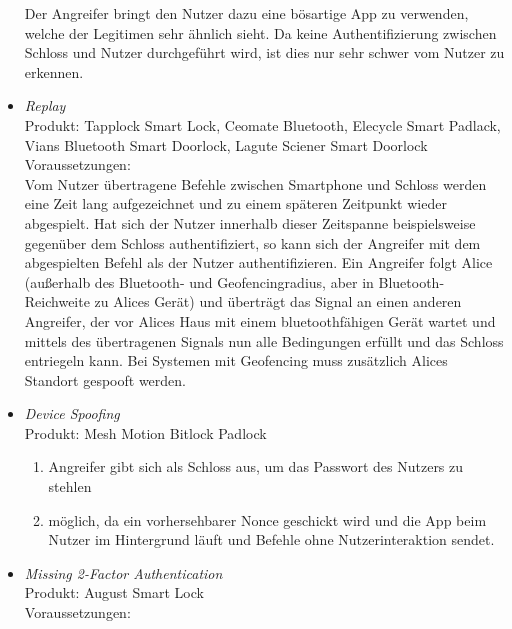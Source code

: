 \begin{itemize}[leftmargin=0cm,label={}]
                Der Angreifer bringt den Nutzer dazu eine bösartige App zu verwenden, welche der Legitimen sehr ähnlich sieht. 
                Da keine Authentifizierung zwischen Schloss und Nutzer durchgeführt wird, ist dies nur sehr schwer vom Nutzer zu erkennen.
            \item \emph{Replay}\cite{Tierney2018,Rose2016,Ho2016}\label{vuln:replay}\\
                Produkt: Tapplock Smart Lock, Ceomate Bluetooth, Elecycle Smart Padlack, Vians Bluetooth Smart Doorlock, Lagute Sciener Smart Doorlock\\
                Voraussetzungen: \\  
                Vom Nutzer übertragene Befehle zwischen Smartphone und Schloss werden eine Zeit lang aufgezeichnet und zu einem späteren Zeitpunkt wieder abgespielt. 
                Hat sich der Nutzer innerhalb dieser Zeitspanne beispielsweise gegenüber dem Schloss authentifiziert, so kann sich der Angreifer mit dem abgespielten Befehl als der Nutzer authentifizieren.
                Ein Angreifer folgt Alice (außerhalb des Bluetooth- und Geofencingradius, aber in Bluetooth-Reichweite zu Alices Gerät) und überträgt das Signal an einen anderen Angreifer, der vor Alices Haus mit einem bluetoothfähigen Gerät wartet und mittels des übertragenen Signals nun alle Bedingungen erfüllt und das Schloss entriegeln kann.
                Bei Systemen mit Geofencing muss zusätzlich Alices Standort gespooft werden.
            \item \emph{Device Spoofing}\cite{Rose2016}\label{vuln:spoofing}\\
                Produkt: Mesh Motion Bitlock Padlock\\
                \begin{enumerate}[noitemsep]
    	            \item Angreifer gibt sich als Schloss aus, um das Passwort des Nutzers zu stehlen
    	            \item möglich, da ein vorhersehbarer Nonce geschickt wird und die App beim Nutzer im Hintergrund läuft und Befehle ohne Nutzerinteraktion sendet.
    	        \end{enumerate}
	        \item \emph{Missing 2-Factor Authentication}\cite{Jmaxxz2015}\label{vuln:2-factor}\\
                Produkt: August Smart Lock\\
                Voraussetzungen: \\  

\end{itemize}
